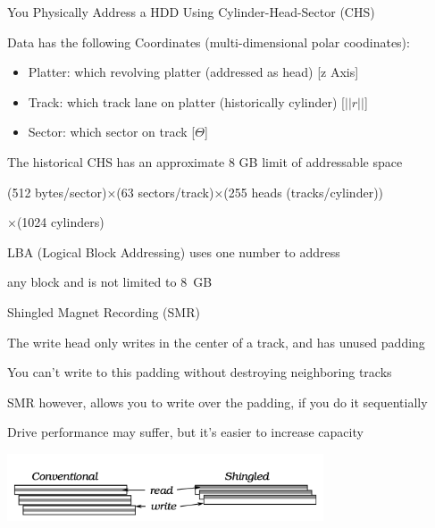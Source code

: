   \begin{frame}{You Physically Address a HDD Using Cylinder-Head-Sector (CHS)}

    Data has the following Coordinates (multi-dimensional polar coodinates):

    \begin{itemize}
      \item Platter: which revolving platter (addressed as head) [z Axis]
      \item Track: which track lane on platter (historically cylinder) [$||r||$]
      \item Sector: which sector on track [$\Theta$]
    \end{itemize}

    \vspace{2em}

    The historical CHS has an approximate 8 GB limit of addressable space

    \hspace{2em} (512 bytes/sector)×(63 sectors/track)×(255 heads (tracks/cylinder))

    \hspace{2em} ×(1024 cylinders)

    \vspace{2em}

    LBA (Logical Block Addressing) uses one number to address

    any block and is not limited to 8~GB
  \end{frame}

  \begin{frame}{Shingled Magnet Recording (SMR)}

    The write head only writes in the center of a track, and has unused padding

    \vspace{2em}

    You can't write to this padding without destroying neighboring tracks

    \vspace{2em}

    SMR however, allows you to write over the padding, if you do it sequentially

    \vspace{2em}

    Drive performance may suffer, but it's easier to increase capacity 

    \includegraphics[height=20mm]{hdd2.png}
  \end{frame}

